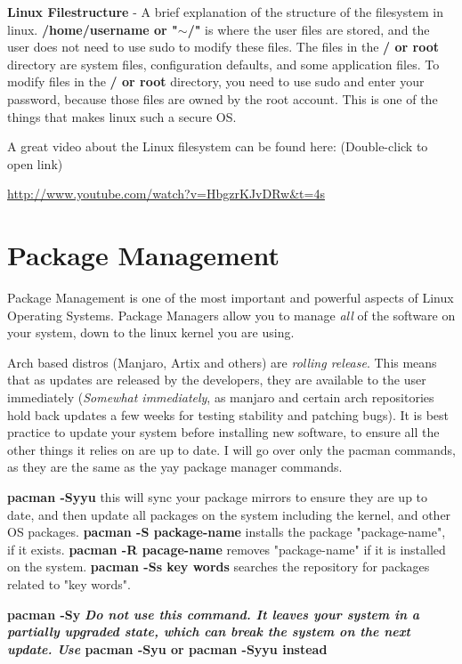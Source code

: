 \documentclass[12pt, letterpaper, twoside]{article}
\begin{document}
\textbf{Linux Filestructure} - A brief explanation of the structure of the filesystem in linux. \textbf{/home/username or "$\mathtt{\sim}$/"} is where the user files are stored, and the user does not need to use sudo to modify these files. The files in the \textbf{/ or root} directory are system files, configuration defaults, and some application files. To modify files in the \textbf{/ or root} directory, you need to use sudo and enter your password, because those files are owned by the root account. This is one of the things that makes linux such a secure OS.

A great video about the Linux filesystem can be found here: 
(Double-click to open link)

\url{http://www.youtube.com/watch?v=HbgzrKJvDRw&t=4s}

\section{Package Management}

Package Management is one of the most important and powerful aspects of Linux Operating Systems. Package Managers allow you to manage \textit{all} of the software on your system, down to the linux kernel you are using. 

Arch based distros (Manjaro, Artix and others) are \textit{rolling release}. This means that as updates are released by the developers, they are available to the user immediately (\textit{Somewhat immediately}, as manjaro and certain arch repositories hold back updates a few weeks for testing stability and patching bugs). It is best practice to update your system before installing new software, to ensure all the other things it relies on are up to date. I will go over only the pacman commands, as they are the same as the yay package manager commands.

\textbf{pacman -Syyu} this will sync your package mirrors to ensure they are up to date, and then update all packages on the system including the kernel, and other OS packages. \textbf{pacman -S package-name} installs the package "package-name", if it exists. \textbf{pacman -R pacage-name} removes "package-name" if it is installed on the system. \textbf{pacman -Ss key words} searches the repository for packages related to "key words".

\textbf{pacman -Sy} \textbf{\textit{Do not use this command. It leaves your system in a partially upgraded state, which can break the system on the next update. Use }pacman -Syu or pacman -Syyu instead}
\end{document}
